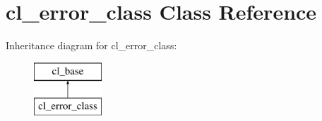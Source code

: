 \hypertarget{classcl__error__class}{
\section{cl\_\-error\_\-class Class Reference}
\label{classcl__error__class}
}
Inheritance diagram for cl\_\-error\_\-class:\begin{figure}[H]
\begin{center}
\leavevmode
\includegraphics[height=2.000000cm]{classcl__error__class}
\end{center}
\end{figure}
